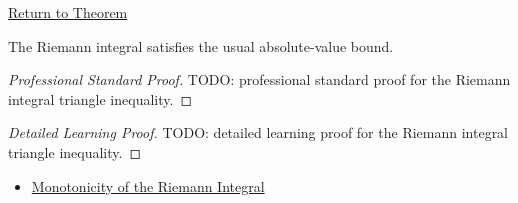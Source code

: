 \newpage
{}
\label{prf:riemann-integral-triangle-inequality}

\begin{remark*}[Return]
\hyperref[thm:riemann-integral-triangle-inequality]{Return to Theorem}
\end{remark*}

\begin{theorem*}
The Riemann integral satisfies the usual absolute-value bound.
\end{theorem*}

\begin{proof}[Professional Standard Proof]
\LRAProofBodyStart
TODO: professional standard proof for the Riemann integral triangle inequality.
\end{proof}

\begin{proof}[Detailed Learning Proof]
\LRAProofBodyStart
TODO: detailed learning proof for the Riemann integral triangle inequality.
\end{proof}

\begin{remark*}
\end{remark*}

\begin{dependencies}
\begin{itemize}
  \item \hyperref[thm:riemann-integral-monotonicity]{Monotonicity of the Riemann Integral}
\end{itemize}
\end{dependencies}

\clearpage
